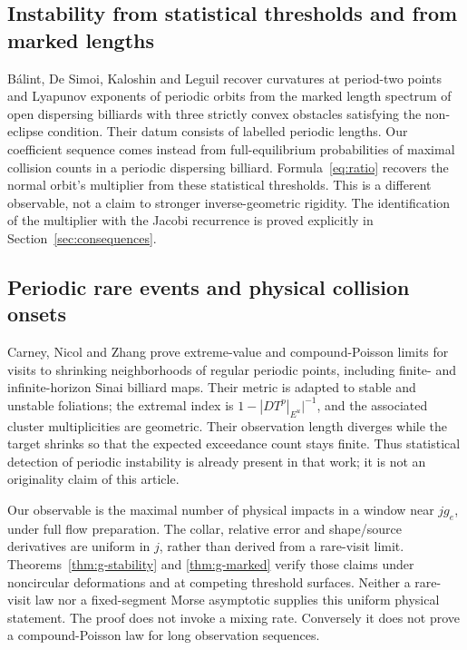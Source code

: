 \subsection{Instability from statistical thresholds and from marked lengths}
B\'alint, De Simoi, Kaloshin and Leguil \cite{BDKL} recover curvatures at
period-two points and Lyapunov exponents of periodic orbits from the marked
length spectrum of open dispersing billiards with three strictly convex
obstacles satisfying the non-eclipse condition. Their datum consists of
labelled periodic lengths. Our coefficient sequence comes instead from
full-equilibrium probabilities of maximal collision counts in a periodic
dispersing billiard. Formula~\eqref{eq:ratio} recovers the normal
orbit's multiplier from these statistical thresholds. This is a different
observable, not a claim to stronger inverse-geometric rigidity. The
identification of the multiplier with the Jacobi recurrence is proved
explicitly in Section~\ref{sec:consequences}.


\subsection{Periodic rare events and physical collision onsets}
Carney, Nicol and Zhang \cite[Theorems 1--2]{CNZ} prove extreme-value
and compound-Poisson limits for visits to shrinking neighborhoods of
regular periodic points, including finite- and infinite-horizon Sinai
billiard maps. Their metric is adapted to stable and unstable foliations;
the extremal index is $1-|DT^p|_{E^u}|^{-1}$, and the associated
cluster multiplicities are geometric. Their observation length diverges
while the target shrinks so that the expected exceedance count stays
finite. Thus statistical detection of periodic instability is already
present in that work; it is not an originality claim of this article.

Our observable is the maximal number of physical impacts in a window
near $jg_e$, under full flow preparation. The collar, relative error and
shape/source derivatives are uniform in $j$, rather than derived from
a rare-visit limit. Theorems~\ref{thm:g-stability} and
\ref{thm:g-marked} verify those claims under noncircular deformations
and at competing threshold surfaces. Neither a rare-visit law nor a
fixed-segment Morse asymptotic supplies this uniform physical statement.
The proof does not invoke a mixing rate. Conversely it does not prove
a compound-Poisson law for long observation sequences.

